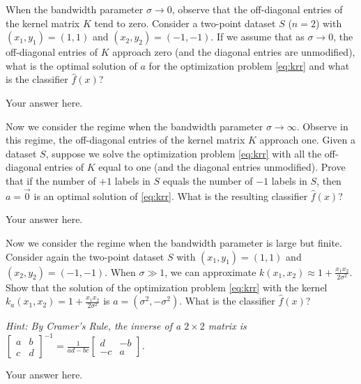 \begin{Parts}

\Part When the bandwidth parameter $\sigma \to 0$, observe that the off-diagonal entries
of the kernel matrix $K$ tend to zero.
Consider a two-point dataset $S$ ($n=2$) with $(x_1, y_1) = (1, 1)$ and $(x_2, y_2) = (-1, -1)$.
If we assume that as $\sigma \to 0$, the off-diagonal entries of $K$ approach zero (and the diagonal entries are unmodified),
what is the optimal solution of $a$ for the optimization problem \eqref{eq:krr}
and what is the classifier $\widehat{f}(x)$?

\begin{solution}
Your answer here.
\end{solution}

\Part Now we consider the regime when the bandwidth parameter $\sigma \to \infty$.
Observe in this regime, the off-diagonal entries of the kernel matrix $K$ approach one.
{Given a dataset $S$, suppose we solve the optimization problem \eqref{eq:krr}
with all the off-diagonal entries of $K$ equal to one (and the diagonal entries unmodified).}
Prove that if the number of $+1$ labels in $S$ equals the number of $-1$ labels in $S$,
then $a=\vec{0}$ is an optimal solution of \eqref{eq:krr}.
What is the resulting classifier $\widehat{f}(x)$?

\begin{solution}
Your answer here.
\end{solution}

\Part Now we consider the regime when the bandwidth parameter is large but finite.
Consider again the two-point dataset $S$ with $(x_1, y_1) = (1, 1)$ and $(x_2, y_2) = (-1, -1)$.
When $\sigma \gg 1$, we can approximate $k(x_1, x_2) \approx 1 + \frac{x_1 x_2}{2\sigma^2}$.
Show that the solution of the optimization problem \eqref{eq:krr}
with the kernel $k_a(x_1, x_2) = 1 + \frac{x_1 x_2}{2\sigma^2}$ is
$a = (\sigma^2, -\sigma^2)$.
What is the classifier $\widehat{f}(x)$?

\emph{Hint: By Cramer's Rule, the inverse of a $2 \times 2$ matrix is $\begin{bmatrix} a & b \\ c & d \end{bmatrix}^{-1} = \frac{1}{ad-bc} \begin{bmatrix} d & -b \\ -c & a \end{bmatrix}$.}

\begin{solution}
Your answer here.
\end{solution}

\end{Parts}

